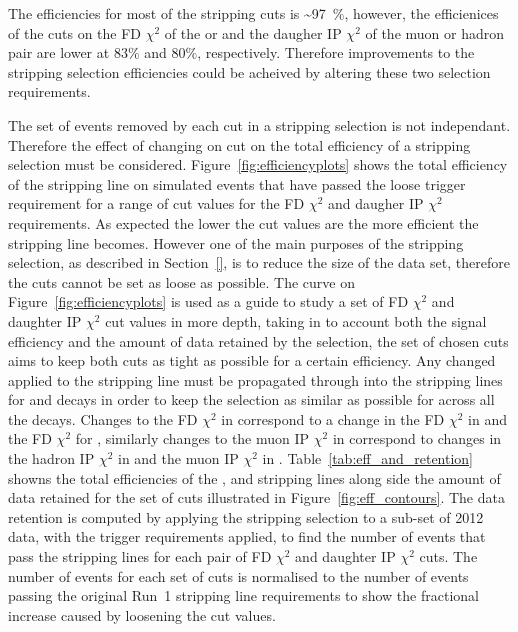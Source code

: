 The efficiencies for most of the stripping cuts is \sim 97~$\%$, however, the efficienices of the cuts on the FD $\chi^{2}$ of the \bsd or \jpsi and the daugher IP $\chi^{2}$ of the muon or hadron pair are lower at $83\%$ and $80\%$, respectively. Therefore improvements to the stripping selection efficiencies could be acheived by altering these two selection requirements. 


The set of events removed by each cut in a stripping selection is not independant. Therefore the effect of changing on cut on the total efficiency of a stripping selection must be considered. Figure~\ref{fig:efficiencyplots} shows the total efficiency of the \bsmumu stripping line on simulated \bsmumu events that have passed the loose trigger requirement for a range of cut values for the FD $\chi^{2}$ and daugher IP $\chi^{2}$ requirements. As expected the lower the cut values are the more efficient the stripping line becomes. However one of the main purposes of the stripping selection, as described in Section~\ref{}, is to reduce the size of the data set, therefore the cuts cannot be set as loose as possible. The curve on Figure~\ref{fig:efficiencyplots} is used as a guide to study a set of FD $\chi^{2}$ and daughter IP $\chi^{2}$ cut values in more depth, taking in to account both the signal efficiency and the amount of data retained by the selection, the set of chosen cuts aims to keep both cuts as tight as possible for a certain efficiency. Any changed applied to the \bmumu stripping line must be propagated through into the stripping lines for \bhh and \bujpsik decays in order to keep the selection as similar as possible for across all the decays. Changes to the \bsd FD $\chi^{2}$ in \bsmumu correspond to a change in the \bsd FD $\chi^{2}$ in \bhh and the \jpsi FD $\chi^{2}$ for \bujpsik, similarly changes to the muon IP $\chi^{2}$ in \bsmumu correspond to changes in the hadron IP $\chi^{2}$ in \bhh and the muon IP $\chi^{2}$ in \bujpsik. Table~\ref{tab:eff_and_retention} showns the total efficiencies of the \bmumu, \bhh and \bujpsik stripping lines along side the amount of data retained for the set of cuts illustrated in Figure~\ref{fig:eff_contours}. The data retention is computed by applying the stripping selection to a sub-set of 2012 data, with the trigger requirements applied, to find the number of events that pass the stripping lines for each pair of FD $\chi^{2}$ and daughter IP $\chi^{2}$ cuts. The number of events for each set of cuts is normalised to the number of events passing the original Run~1 stripping line requirements  to show the fractional increase caused by loosening the cut values. 

